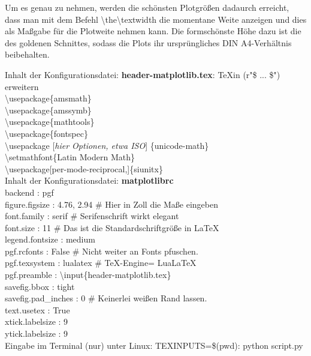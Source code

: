 Um es genau zu nehmen, werden die schönsten Plotgrößen dadaurch erreicht, dass man mit dem Befehl \backslash\textsf{the}\backslash\textsf{textwidth} die momentane Weite anzeigen und dies als Maßgabe für die Plotweite nehmen kann.
Die formschönste Höhe dazu ist die des goldenen Schnittes, sodass die Plots ihr ursprüngliches DIN A4-Verhältnis beibehalten.

Inhalt der Konfigurationsdatei:
\textbf{\textsf{header-matplotlib.tex}}: \TeX in (r"\$ ... \$") erweitern\\
\backslash usepackage\{amsmath\} \\
\backslash usepackage\{amssymb\} \\
\backslash usepackage\{mathtools\} \\
\backslash usepackage\{fontspec\} \\
\backslash usepackage [\emph{hier Optionen, etwa ISO}] \{unicode-math\} \\
\backslash setmathfont\{Latin Modern Math\} \\
\backslash usepackage[per-mode-reciprocal,]\{siunitx\} \\

Inhalt der Konfigurationsdatei: 
\textbf{\textsf{matplotlibrc}}\\
backend : pgf \\
figure.figsize : 4.76, 2.94  \# Hier in Zoll die Maße eingeben\\
font.family : serif  \# Serifenschrift wirkt elegant \\
font.size : 11  \# Das ist die Standardschriftgröße in \LaTeX\\ 
legend.fontsize : medium \\
pgf.rcfonts : False \# Nicht weiter an Fonts pfuschen.\\
pgf.texsystem : lualatex \# TeX-Engine= LuaLaTeX\\
pgf.preamble : \backslash input\{header-matplotlib.tex\} \\
savefig.bbox : tight \\
savefig.pad\_inches : 0  \# Keinerlei weißen Rand lassen.\\
text.usetex : True \\
xtick.labelsize : 9 \\
ytick.labelsize : 9 \\

Eingabe im Terminal (nur) unter Linux: 
TEXINPUTS=\$(pwd): python script.py


